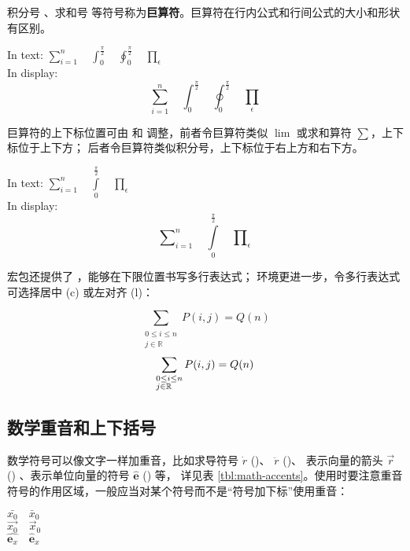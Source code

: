 积分号 、求和号  等符号称为\textbf{巨算符}。巨算符在行内公式和行间公式的大小和形状有区别。
\begin{example}
In text: 
$\sum_{i=1}^n \quad
\int_0^{\frac{\pi}{2}} \quad
\oint_0^{\frac{\pi}{2}} \quad
\prod_\epsilon $ \\
In display:
\[\sum_{i=1}^n \quad
\int_0^{\frac{\pi}{2}} \quad
\oint_0^{\frac{\pi}{2}} \quad
\prod_\epsilon \]
\end{example}

巨算符的上下标位置可由  和  调整，前者令巨算符类似 $\lim$ 或求和算符 $\sum$，上下标位于上下方；
后者令巨算符类似积分号，上下标位于右上方和右下方。
\begin{example}
In text: 
$\sum\limits_{i=1}^n \quad
\int\limits_0^{\frac{\pi}{2}} \quad
\prod\limits_\epsilon $ \\
In display:
\[\sum\nolimits_{i=1}^n \quad
\int\limits_0^{\frac{\pi}{2}} \quad
\prod\nolimits_\epsilon \]
\end{example}

 宏包还提供了 ，能够在下限位置书写多行表达式； 
环境更进一步，令多行表达式可选择居中 (c) 或左对齐 (l)：
\begin{example}
\[
\sum_{\substack{0\le i\le n \\
  j\in \mathbb{R}}}
P(i,j) = Q(n)
\]
\[
\sum_{\begin{subarray}{l}
  0\le i\le n \\
  j\in \mathbb{R}
\end{subarray}}
P(i,j) = Q(n)
\]
\end{example}

\subsection{数学重音和上下括号}\label{subsec:math-accents}

数学符号可以像文字一样加重音，比如求导符号 $\dot{r}$ ()、 $\ddot{r}$ ()、
表示向量的箭头 $\vec{r}$ () 、表示单位向量的符号 $\hat{\mathbf{e}}$ () 等，
详见表 \ref{tbl:math-accents}。使用时要注意重音符号的作用区域，一般应当对某个符号而不是“符号加下标”使用重音：
\begin{example}
$\bar{x_0} \quad \bar{x}_0$\\[5pt]
$\vec{x_0} \quad \vec{x}_0$\\[5pt]
$\hat{\mathbf{e}_x} \quad
 \hat{\mathbf{e}}_x$
\end{example}

